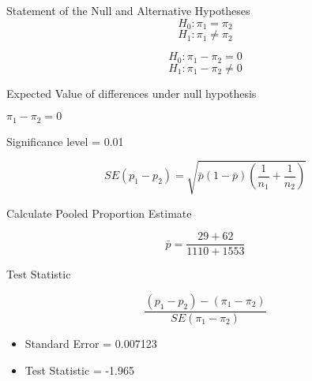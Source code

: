 
Statement of the Null and Alternative Hypotheses
\[H_0 : \pi_1 = \pi_2\]
\[H_1 : \pi_1 \neq \pi_2\]

\[H_0 : \pi_1 - \pi_2 = 0\]
\[H_1 : \pi_1 -  \pi_2 \neq 0\]

Expected Value of differences under null hypothesis

$\pi_1 - \pi_2 = 0$


Significance level = 0.01

\[SE(p_1 - p_2) = \sqrt{\bar{p}(1-\bar{p})\left( \frac{1}{n_1} + \frac{1}{n_2} \right)  }\]

Calculate Pooled Proportion Estimate

\[ \bar{p} = \frac{29 + 62}{1110 + 1553} \]

Test Statistic

\[ \frac{(p_1 - p_2) - (\pi_1 - \pi_2)}{SE(\pi_1 - \pi_2)} \]


\begin{itemize}
\item Standard Error = 0.007123
\item Test Statistic = -1.965
\end{itemize}

